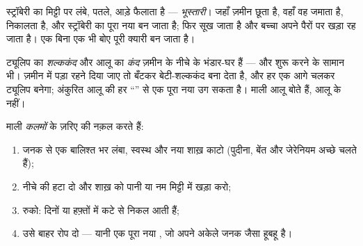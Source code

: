 \begin{example}[स्ट्रॉबेरी के भूस्तारी]\label{ex:g4:plants-without-seeds:runner}
स्ट्रॉबेरी का  मिट्टी पर लंबे, पतले, आड़े  फैलाता है ---
\emph{भूस्तारी}। जहाँ  ज़मीन छूता है, वहाँ वह
 जमाता है,  निकालता है, और स्ट्रॉबेरी का पूरा नया  बन
जाता है; फिर  सूख जाता है और बच्चा अपने पैरों पर खड़ा रह जाता
है। एक  बिना एक भी  बोए पूरी क्यारी बन जाता है।
\end{example}

\begin{example}[शल्ककंद और कंद]\label{ex:g4:plants-without-seeds:bulbtuber}
ट्यूलिप का \emph{शल्ककंद} और आलू का
\emph{कंद} ज़मीन के नीचे के भंडार-घर हैं --- और शुरू करने
के सामान भी। ज़मीन में पड़ा रहने दिया जाए तो  बँटकर बेटी-शल्ककंद
बना देता है, और हर एक आगे चलकर ट्यूलिप बनेगा; अंकुरित आलू की हर
``'' से एक पूरा नया  उग सकता है। माली आलू बोते हैं, आलू के 
नहीं।
\end{example}

\begin{method}[कलम लेना]\label{met:g4:plants-without-seeds:cutting}
माली \emph{कलमों} के ज़रिए  की नक़ल करते हैं:
\begin{enumerate}
  \item जनक  से एक बालिश्त भर लंबा, स्वस्थ और नया शाख़ काटो
        (पुदीना, बेंत और जेरेनियम अच्छे चलते हैं);
  \item नीचे की  हटा दो और शाख़ को पानी या नम मिट्टी में
        खड़ा करो;
  \item रुको: दिनों या हफ़्तों में कटे  से  निकल आती हैं;
  \item उसे बाहर रोप दो --- यानी एक पूरा नया , जो अपने अकेले जनक
        जैसा हूबहू है।
\end{enumerate}
\end{method}

